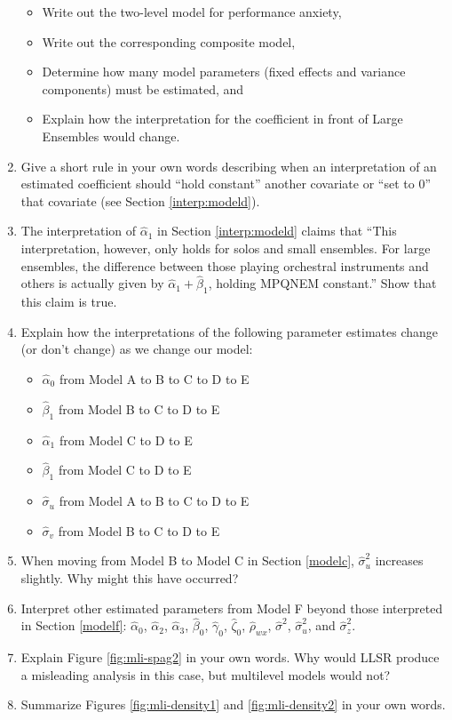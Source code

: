 \documentclass[
]{krantz}
\providecommand{\tightlist}{%
  \setlength{\itemsep}{0pt}\setlength{\parskip}{0pt}}
\begin{document}
\begin{enumerate}
  \begin{itemize}
  \tightlist
  \item
    Write out the two-level model for performance anxiety,
  \item
    Write out the corresponding composite model,
  \item
    Determine how many model parameters (fixed effects and variance components) must be estimated, and
  \item
    Explain how the interpretation for the coefficient in front of Large Ensembles would change.
  \end{itemize}
\item
  Give a short rule in your own words describing when an interpretation of an estimated coefficient should ``hold constant'' another covariate or ``set to 0'' that covariate (see Section \ref{interp:modeld}).
\item
  The interpretation of \(\hat{\alpha}_{1}\) in Section \ref{interp:modeld} claims that ``This interpretation, however, only holds for solos and small ensembles. For large ensembles, the difference between those playing orchestral instruments and others is actually given by \(\hat{\alpha}_{1}+\hat{\beta}_{1}\), holding MPQNEM constant.'' Show that this claim is true.
\item
  Explain how the interpretations of the following parameter estimates change (or don't change) as we change our model:

  \begin{itemize}
  \tightlist
  \item
    \(\hat{\alpha}_{0}\) from Model A to B to C to D to E
  \item
    \(\hat{\beta}_{1}\) from Model B to C to D to E
  \item
    \(\hat{\alpha}_{1}\) from Model C to D to E
  \item
    \(\hat{\beta}_{1}\) from Model C to D to E
  \item
    \(\hat{\sigma}_{u}\) from Model A to B to C to D to E
  \item
    \(\hat{\sigma}_{v}\) from Model B to C to D to E
  \end{itemize}
\item
  When moving from Model B to Model C in Section \ref{modelc}, \(\hat{\sigma}_{u}^{2}\) increases slightly. Why might this have occurred?
\item
  Interpret other estimated parameters from Model F beyond those interpreted in Section \ref{modelf}: \(\hat{\alpha}_{0}\), \(\hat{\alpha}_{2}\), \(\hat{\alpha}_{3}\), \(\hat{\beta}_{0}\), \(\hat{\gamma}_{0}\), \(\hat{\zeta}_{0}\), \(\hat{\rho}_{wx}\), \(\hat{\sigma}^{2}\), \(\hat{\sigma}_{u}^{2}\), and \(\hat{\sigma}_{z}^{2}\).
\item
  Explain Figure \ref{fig:mli-spag2} in your own words. Why would LLSR produce a misleading analysis in this case, but multilevel models would not?
\item
  Summarize Figures \ref{fig:mli-density1} and \ref{fig:mli-density2} in your own words.
\end{enumerate}
\end{document}
